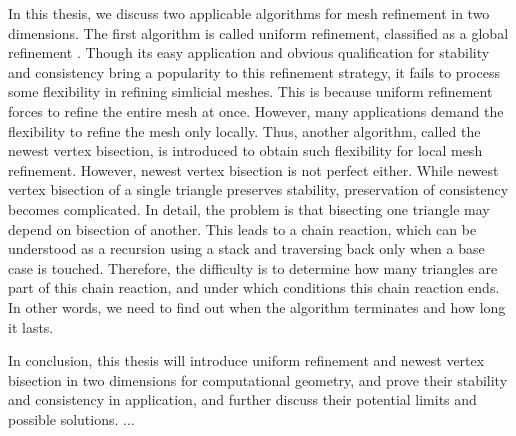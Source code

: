In this thesis, we discuss two applicable algorithms for mesh refinement in two dimensions. The first algorithm is called uniform refinement, classified as a global refinement \cite{bank1983some,bey2000simplicial,Bey1995}. Though its easy application and obvious qualification for stability and consistency bring a popularity to this refinement strategy, it fails to process some flexibility in refining simlicial meshes. This is because uniform refinement forces to refine the entire mesh at once. However, many applications demand the flexibility to refine the mesh only locally. Thus, another algorithm, called the newest vertex bisection, is introduced to obtain such flexibility for local mesh refinement. However, newest vertex bisection is not perfect either. While newest vertex bisection of a single triangle preserves stability, preservation of consistency becomes complicated. In detail, the problem is that bisecting one triangle may depend on bisection of another. This leads to a chain reaction, which can be understood as a recursion using a stack and traversing back only when a base case is touched. Therefore, the difficulty is to determine how many triangles are part of this chain reaction, and under which conditions this chain reaction ends. In other words, we need to find out when the algorithm terminates and how long it lasts. 

In conclusion, this thesis will introduce uniform refinement and newest vertex bisection in two dimensions for computational geometry, and prove their stability and consistency in application, and further discuss their potential limits and possible solutions.
...